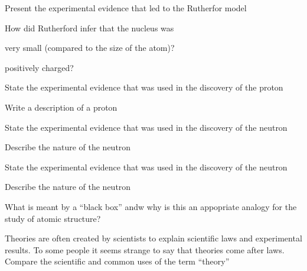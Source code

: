 \begin{problems}
    \item Present the experimental evidence that led to the Rutherfor model
    \item How did Rutherford infer that the nucleus was
        \begin{enum-alph}
            \item very small (compared to the size of the atom)?
            \item positively charged?
        \end{enum-alph}
    \item
        \begin{enum-alph}
            \item State the experimental evidence that was used in the discovery of the proton
            \item Write a description of a proton
        \end{enum-alph}
    \item 
        \begin{enum-alph}
            \item State the experimental evidence that was used in the discovery of the neutron
            \item Describe the nature of the neutron
        \end{enum-alph}
    \item 
        \begin{enum-alph}
            \item State the experimental evidence that was used in the discovery of the neutron
            \item Describe the nature of the neutron
        \end{enum-alph}
    \item What is meant by a ``black box'' andw why is this an appopriate analogy for the study
        of atomic structure?
    \item Theories are often created by scientists to explain scientific laws and experimental
        results. To some people it seems strange to say that theories come after laws. Compare
        the scientific and common uses of the term ``theory''
\end{problems}

